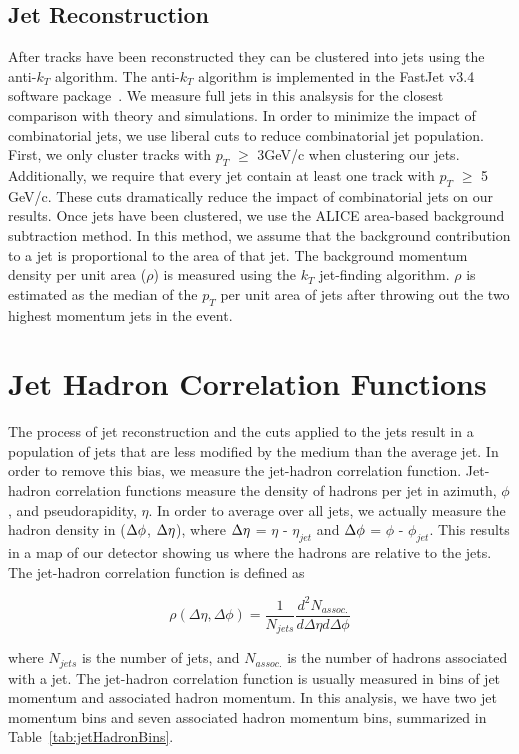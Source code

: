 \subsection*{Jet Reconstruction}
After tracks have been reconstructed they can be clustered into jets using the anti-$k_T$ algorithm. The anti-$k_T$ algorithm is implemented in the FastJet v3.4 software package~\cite{FastJet}. We measure full jets in this analsysis for the closest comparison with theory and simulations. In order to minimize the impact of combinatorial jets, we use liberal cuts to reduce combinatorial jet population. First, we only cluster tracks with $p_T$ $\geq$ 3GeV/c when clustering our jets. Additionally, we require that every jet contain at least one track with $p_T$ $\geq$ 5 GeV/c. These cuts dramatically reduce the impact of combinatorial jets on our results. Once jets have been clustered, we use the ALICE area-based background subtraction method. In this method, we assume that the background contribution to a jet is proportional to the area of that jet. The background momentum density per unit area ($\rho$) is measured using the $k_T$ jet-finding algorithm. $\rho$ is estimated as the median of the $p_T$ per unit area of jets after throwing out the two highest momentum jets in the event.

\section{Jet Hadron Correlation Functions}
 The process of jet reconstruction and the cuts applied to the jets result in a population of jets that are less modified by the medium than the average jet. In order to remove this bias, we measure the jet-hadron correlation function. Jet-hadron correlation functions measure the density of hadrons per jet in azimuth, $\phi$, and pseudorapidity, $\eta$. In order to average over all jets, we actually measure the hadron density in ($\Delta \phi$, $\Delta \eta$), where $\Delta \eta$ = $\eta$ - $\eta_{jet}$ and $\Delta \phi$ = $\phi$ - $\phi_{jet}$. This results in a map of our detector showing us where the hadrons are relative to the jets. The jet-hadron correlation function is defined as 

\begin{equation}
    \rho(\Delta \eta, \Delta \phi) = \frac{1}{N_{jets}} \frac{d^2N_{assoc.}}{d\Delta \eta d\Delta \phi}
\end{equation}

\noindent where $N_{jets}$ is the number of jets, and $N_{assoc.}$ is the number of hadrons associated with a jet. The jet-hadron correlation function is usually measured in bins of jet momentum and associated hadron momentum. In this analysis, we have two jet momentum bins and seven associated hadron momentum bins, summarized in Table~\ref{tab:jetHadronBins}. 

